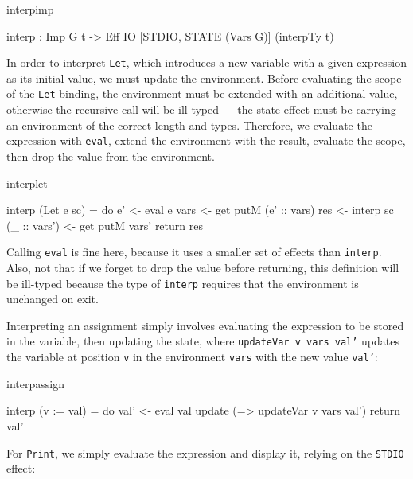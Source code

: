 \begin{SaveVerbatim}{interpimp}

interp : Imp G t -> 
         Eff IO [STDIO, STATE (Vars G)] (interpTy t)

\end{SaveVerbatim}

\noindent
In order to interpret \texttt{Let}, which introduces a new variable with
a given expression as its initial value, we must update the environment.
Before evaluating the scope of the \texttt{Let} binding, the environment
must be extended with an additional value, otherwise the recursive call
will be ill-typed --- the state effect must be carrying an environment
of the correct length and types. Therefore, we evaluate the expression
with \texttt{eval}, extend the environment with the result, evaluate the
scope, then drop the value from the environment.

\begin{SaveVerbatim}{interplet}

interp (Let e sc) = do e' <- eval e
                    vars <- get
                    putM (e' :: vars)
                    res <- interp sc
                    (_ :: vars') <- get
                    putM vars'
                    return res
\end{SaveVerbatim}

\noindent
Calling \texttt{eval} is fine here, because it uses a smaller set of effects
than \texttt{interp}. Also, not that if we forget to drop the value before
returning, this definition will be ill-typed because the type of
\texttt{interp} requires that the environment is unchanged on exit.

Interpreting an assignment simply involves evaluating the expression to be
stored in the variable, then updating the state, where \texttt{updateVar v vars
val'}
updates the variable at position \texttt{v} in the environment \texttt{vars} with
the new value \texttt{val'}:

\begin{SaveVerbatim}{interpassign}

interp (v := val) 
     = do val' <- eval val
          update (\vars => updateVar v vars val')
          return val'

\end{SaveVerbatim}

\noindent
For \texttt{Print}, we simply evaluate the expression and display it, relying
on the \texttt{STDIO} effect:

